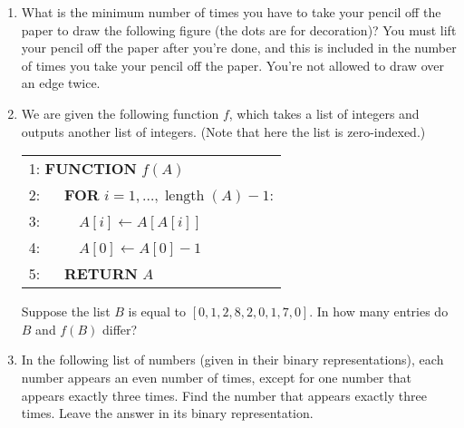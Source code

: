 \documentclass[10pt]{article}
\begin{document}
\begin{enumerate}

\item What is the minimum number of times you have to take your pencil off the paper to draw the following figure (the dots are for decoration)? You must lift your pencil off the paper after you're done, and this is included in the number of times you take your pencil off the paper. You're not allowed to draw over an edge twice. 

\begin{center}
\end{center}






\item We are given the following function $f$, which takes a list of integers and outputs another list of integers.  (Note that here the list is zero-indexed.)

\begin{tabular}{l}
1: \textbf{FUNCTION} $f(A)$ \\
2: $\quad$ \textbf{FOR} $i=1,\ldots, \operatorname{length}(A)-1$: \\
3: $\quad\quad$ $A[i]\leftarrow A[A[i]]$ \\
4: $\quad\quad$ $A[0]\leftarrow A[0]-1$ \\
5: $\quad$ \textbf{RETURN} $A$
\end{tabular}

\par Suppose the list $B$ is equal to $[0,1,2,8,2,0,1,7,0]$.  In how many entries do $B$ and $f(B)$ differ?





\item In the following list of numbers (given in their binary representations), each number appears an even number of times, except for one number that appears exactly three times. Find the number that appears exactly three times. Leave the answer in its binary representation.


\end{enumerate}
\end{document}
